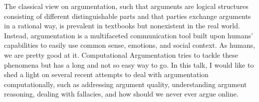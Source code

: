 The classical view on argumentation, such that arguments are logical structures consisting of different distinguishable parts and that parties exchange arguments in a rational way, is prevalent in textbooks but nonexistent in the real world. Instead, argumentation is a multifaceted communication tool built upon humans' capabilities to easily use common sense, emotions, and social context. As humans, we are pretty good at it. Computational Argumentation tries to tackle these phenomena but has a long and not so easy way to go. In this talk, I would like to shed a light on several recent attempts to deal with argumentation computationally, such as addressing argument quality, understanding argument reasoning, dealing with fallacies, and how should we never ever argue online.
